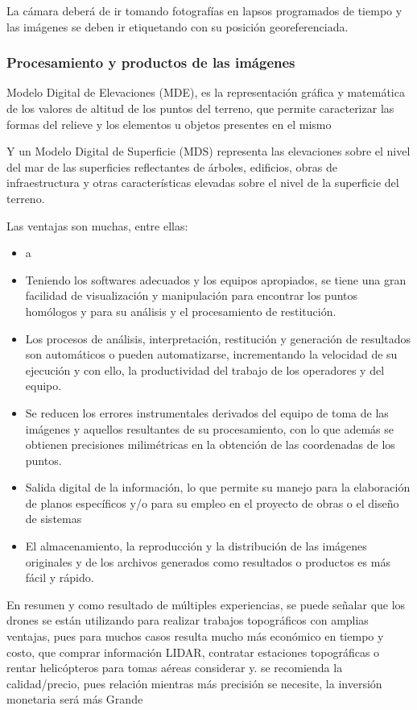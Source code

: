 La cámara deberá de ir tomando fotografías en lapsos programados de tiempo y las imágenes se deben ir etiquetando con su posición georeferenciada.

\subsubsection{Procesamiento y productos de las imágenes}

Modelo Digital de Elevaciones (MDE), es la representación gráfica y matemática de los valores de altitud de los puntos del terreno, que permite caracterizar las formas del relieve y los elementos u objetos presentes en el mismo

Y un Modelo Digital de Superficie (MDS) representa las elevaciones sobre el nivel del mar de las superficies reflectantes de árboles, edificios, obras de infraestructura y otras características elevadas sobre el nivel de la superficie del terreno.

Las ventajas son muchas, entre ellas:

\begin{itemize}
    \item a%
    \item Teniendo los softwares adecuados y los equipos apropiados, se tiene una gran facilidad de visualización y manipulación para encontrar los puntos homólogos y para su análisis y el procesamiento de restitución.
    \item Los procesos de análisis, interpretación, restitución y generación de resultados son automáticos o pueden automatizarse, incrementando la velocidad de su ejecución y con ello, la productividad del trabajo de los operadores y del equipo.
    \item Se reducen los errores instrumentales derivados del equipo de toma de las imágenes y aquellos resultantes de su procesamiento, con lo que además se obtienen precisiones milimétricas en la obtención de las coordenadas de los puntos.
    \item Salida digital de la información, lo que permite su manejo para la elaboración de planos específicos y/o para su empleo en el proyecto de obras o el diseño de sistemas
    \item El almacenamiento, la reproducción y la distribución de las imágenes originales y de los archivos generados como resultados o productos es más fácil y rápido.
\end{itemize}
En resumen y como resultado de múltiples experiencias, se puede señalar que los drones se están utilizando para realizar trabajos topográficos con amplias ventajas, pues para muchos casos resulta mucho más económico en tiempo y costo, que comprar información LIDAR, contratar estaciones topográficas o rentar helicópteros para tomas aéreas considerar y. se recomienda la calidad/precio, pues relación mientras más precisión se necesite, la inversión monetaria será más Grande

